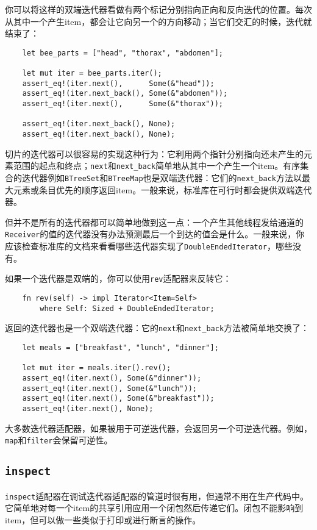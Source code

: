 你可以将这样的双端迭代器看做有两个标记分别指向正向和反向迭代的位置。每次从其中一个产生item，都会让它向另一个的方向移动；当它们交汇的时候，迭代就结束了：
\begin{verbatim}
    let bee_parts = ["head", "thorax", "abdomen"];

    let mut iter = bee_parts.iter();
    assert_eq!(iter.next(),      Some(&"head"));
    assert_eq!(iter.next_back(), Some(&"abdomen"));
    assert_eq!(iter.next(),      Some(&"thorax"));

    assert_eq!(iter.next_back(), None);
    assert_eq!(iter.next_back(), None);
\end{verbatim}

切片的迭代器可以很容易的实现这种行为：它利用两个指针分别指向还未产生的元素范围的起点和终点；\texttt{next}和\texttt{next\_back}简单地从其中一个产生一个item。有序集合的迭代器例如\texttt{BTreeSet}和\texttt{BTreeMap}也是双端迭代器：它们的\texttt{next\_back}方法以最大元素或条目优先的顺序返回item。一般来说，标准库在可行时都会提供双端迭代器。

但并不是所有的迭代器都可以简单地做到这一点：一个产生其他线程发给通道的\texttt{Receiver}的值的迭代器没有办法预测最后一个到达的值会是什么。一般来说，你应该检查标准库的文档来看看哪些迭代器实现了\texttt{DoubleEndedIterator}，哪些没有。

如果一个迭代器是双端的，你可以使用\texttt{rev}适配器来反转它：
\begin{verbatim}
    fn rev(self) -> impl Iterator<Item=Self>
        where Self: Sized + DoubleEndedIterator;
\end{verbatim}

返回的迭代器也是一个双端迭代器：它的\texttt{next}和\texttt{next\_back}方法被简单地交换了：
\begin{verbatim}
    let meals = ["breakfast", "lunch", "dinner"];

    let mut iter = meals.iter().rev();
    assert_eq!(iter.next(), Some(&"dinner"));
    assert_eq!(iter.next(), Some(&"lunch"));
    assert_eq!(iter.next(), Some(&"breakfast"));
    assert_eq!(iter.next(), None);
\end{verbatim}

大多数迭代器适配器，如果被用于可逆迭代器，会返回另一个可逆迭代器。例如，\texttt{map}和\texttt{filter}会保留可逆性。

\subsection{\texttt{inspect}}
\texttt{inspect}适配器在调试迭代器适配器的管道时很有用，但通常不用在生产代码中。它简单地对每一个item的共享引用应用一个闭包然后传递它们。闭包不能影响到item，但可以做一些类似于打印或进行断言的操作。

